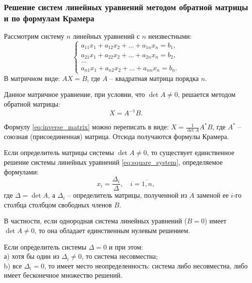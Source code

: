 \documentclass[10pt]{article}
\begin{document}
\subsubsection*{Решение систем линейных уравнений методом обратной матрицы и по формулам Крамера}

Рассмотрим систему \(n\) линейных уравнений с \(n\) неизвестными:
\begin{equation} \label{eq:square_system}
\begin{cases}
a_{11}x_1 + a_{12}x_2 + \dots + a_{1n}x_n = b_1, \\
a_{21}x_1 + a_{22}x_2 + \dots + a_{2n}x_n = b_2, \\
\dots \\
a_{n1}x_1 + a_{n2}x_2 + \dots + a_{nn}x_n = b_n.
\end{cases}
\end{equation}
В матричном виде: \(AX = B\), где \(A\) – квадратная матрица порядка \(n\).

Данное матричное уравнение, при условии, что \(\det A \neq 0\), решается методом обратной матрицы:
\begin{equation} \label{eq:inverse_matrix}
X = A^{-1} B.
\end{equation}

Формулу \eqref{eq:inverse_matrix} можно переписать в виде: \(X = \frac{1}{\det A} A^{*} B\), где \(A^{*}\) – союзная (присоединенная) матрица. Отсюда получаются формулы Крамера.

\begin{theorem}
Если определитель матрицы системы \(\det A \neq 0\), то существует единственное решение системы линейных уравнений \eqref{eq:square_system}, определяемое формулами:
\[
x_i = \frac{\Delta_i}{\Delta},\quad i = \overline{1,n},
\]
где \(\Delta = \det A\), а \(\Delta_i\) – определитель матрицы, полученной из \(A\) заменой ее \(i\)-го столбца столбцом свободных членов \(B\).
\end{theorem}

\begin{remark}
В частности, если однородная система линейных уравнений (\(B = 0\)) имеет \(\det A \neq 0\), то она обладает единственным нулевым решением.
\end{remark}

\begin{remark}
Если определитель системы \(\Delta = 0\) и при этом: \\
а) хотя бы один из \(\Delta_i \neq 0\), то система несовместна; \\
b) все \(\Delta_i = 0\), то имеет место неопределенность: система либо несовместна, либо имеет бесконечное множество решений.
\end{remark}
\end{document}
